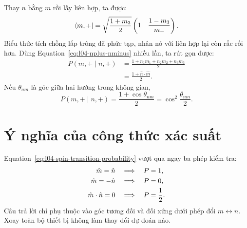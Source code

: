 Thay \(n\) bằng \(m\) rồi lấy liên hợp, ta được:
\begin{equation}
  \left\langle m,+\right\rvert
  =
  \sqrt{\frac{1+m_3}{2}}
  \begin{pmatrix}
    1&
    \dfrac{1-m_3}{m_+}
  \end{pmatrix}.
\end{equation}
Biểu thức tích chồng lấp trông đã phức tạp, nhân nó với liên hợp lại còn rắc rối hơn. Dùng Equation~\eqref{eq:l04-nplus-nminus} nhiều lần, ta rút gọn được:
\begin{equation}
  \begin{aligned}
    P(m,+\mid n,+)
    &=\frac{1+n_1m_1+n_2m_2+n_3m_3}{2}\\
    &=\frac{1+\hat n\cdot\hat m}{2}.
  \end{aligned}
  \label{eq:l04-spin-transition-probability}
\end{equation}
Nếu \(\theta_{nm}\) là góc giữa hai hướng trong không gian,
\begin{equation}
  P(m,+\mid n,+)
  =
  \frac{1+\cos\theta_{nm}}{2}
  =
  \cos^2\frac{\theta_{nm}}{2}.
  \label{eq:l04-half-angle-probability}
\end{equation}

\begin{classroomqa}
\end{classroomqa}

\section{Ý nghĩa của công thức xác suất}

Equation~\eqref{eq:l04-spin-transition-probability} vượt qua ngay ba phép kiểm tra:
\begin{align}
  \hat m=\hat n
  &\quad\Longrightarrow\quad P=1,
  \notag\\
  \hat m=-\hat n
  &\quad\Longrightarrow\quad P=0,
  \notag\\
  \hat m\cdot\hat n=0
  &\quad\Longrightarrow\quad P=\frac12.
\end{align}
Câu trả lời chỉ phụ thuộc vào góc tương đối và đối xứng dưới phép đổi \(m\leftrightarrow n\). Xoay toàn bộ thiết bị không làm thay đổi dự đoán nào.

